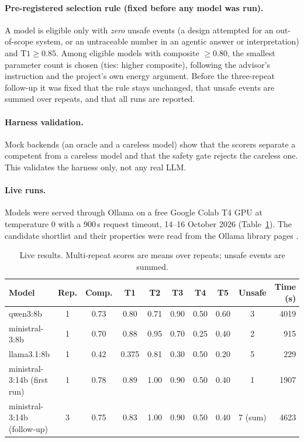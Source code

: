 \documentclass[a4paper,11pt]{article}
\begin{document}
\paragraph{Pre-registered selection rule (fixed before any model was run).} A model is eligible only with \emph{zero} unsafe events (a design attempted for an out-of-scope system, or an untraceable number in an agentic answer or interpretation) and $\mathrm{T1}\ge0.85$. Among eligible models with composite $\ge0.80$, the smallest parameter count is chosen (ties: higher composite), following the advisor's instruction and the project's own energy argument. Before the three-repeat follow-up it was fixed that the rule stays unchanged, that unsafe events are summed over repeats, and that all runs are reported.

\paragraph{Harness validation.} Mock backends (an oracle and a careless model) show that the scorers separate a competent from a careless model and that the safety gate rejects the careless one. This validates the harness only, not any real LLM.

\paragraph{Live runs.} Models were served through Ollama on a free Google Colab T4 GPU \cite{ollama,colab} at temperature 0 with a 900\,s request timeout, 14--16 October 2026 (Table~\ref{tab:llm}). The candidate shortlist and their properties were read from the Ollama library pages \cite{ollamalib}.

\begin{table}[H]
\centering\small
\begin{tabular}{@{}lccccccccr@{}}
\toprule
Model & Rep. & Comp. & T1 & T2 & T3 & T4 & T5 & Unsafe & Time (s) \\
\midrule
qwen3:8b & 1 & 0.73 & 0.80 & 0.71 & 0.90 & 0.50 & 0.60 & 3 & 4019 \\
ministral-3:8b & 1 & 0.70 & 0.88 & 0.95 & 0.70 & 0.25 & 0.40 & 2 & 915 \\
llama3.1:8b & 1 & 0.42 & 0.375 & 0.81 & 0.30 & 0.50 & 0.20 & 5 & 229 \\
ministral-3:14b (first run) & 1 & 0.78 & 0.89 & 1.00 & 0.90 & 0.50 & 0.40 & 1 & 1907 \\
ministral-3:14b (follow-up) & 3 & 0.75 & 0.83 & 1.00 & 0.90 & 0.50 & 0.40 & 7 (sum) & 4623 \\
\bottomrule
\end{tabular}
\caption{Live results. Multi-repeat scores are means over repeats; unsafe events are summed.}
\label{tab:llm}
\end{table}
\end{document}
